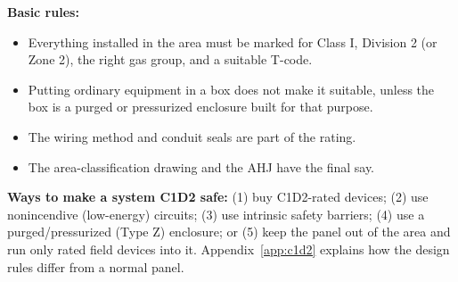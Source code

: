 \textbf{Basic rules:}
\begin{itemize}[itemsep=2pt]
  \item Everything installed in the area must be marked for Class I, Division 2 (or Zone 2), the right gas group, and a suitable T-code.
  \item Putting ordinary equipment in a box does not make it suitable, unless the box is a purged or pressurized enclosure built for that purpose.
  \item The wiring method and conduit seals are part of the rating.
  \item The area-classification drawing and the AHJ have the final say.
\end{itemize}

\textbf{Ways to make a system C1D2 safe:} (1) buy C1D2-rated devices; (2) use nonincendive (low-energy) circuits; (3) use intrinsic safety barriers; (4) use a purged/pressurized (Type Z) enclosure; or (5) keep the panel out of the area and run only rated field devices into it. Appendix~\ref{app:c1d2} explains how the design rules differ from a normal panel.

